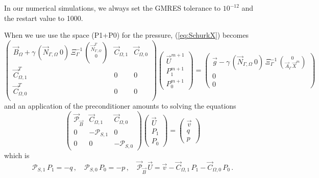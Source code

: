 \documentclass[a4paper,12pt,onecolumn]{article}
\newcommand{\NbulkT}{\vec{N}_{\Gamma,\Omega}^T}
\newcommand{\Nbulk}{\vec{N}_{\Gamma,\Omega}}
\begin{document}
In our numerical simulations, we always set the GMRES tolerance to $10^{-12}$
and the restart value to 1000.

When we use use the space (P1+P0) for the pressure, (\ref{eq:SchurkX}) becomes
\begin{subequations}
\begin{equation} \label{eq:SchurkXP1P0}
\begin{pmatrix}
\vec B_\Omega + \gamma\,(\Nbulk \ 0)\,\Xi_\Gamma^{-1}\,\binom{\NbulkT}{0} &
\vec C_{\Omega,1} & \vec C_{\Omega,0} \\
\vec C^T_{\Omega,1} & 0 & 0 \\
\vec C^T_{\Omega,0} & 0 & 0 \\
\end{pmatrix}
\begin{pmatrix}
\vec U^{m+1} \\
P^{m+1}_1 \\
P^{m+1}_0
\end{pmatrix}
= \begin{pmatrix}
\vec g-\gamma\,(\Nbulk \ 0)\,
\Xi_\Gamma^{-1}\,\binom{0}{\vec{A}_\Gamma\,\vec{X}^{m}} \\
0 \\
0
\end{pmatrix}
\end{equation}
\end{subequations}
and an application of the preconditioner amounts to solving the equations
\begin{equation*}
\begin{pmatrix}
\vec{\mathcal{P}}_{\vec B} & \vec C_{\Omega,1} & \vec C_{\Omega,0} \\
0 & -\mathcal{P}_{S,1} & 0 \\
0 & 0 &-\mathcal{P}_{S,0}
\end{pmatrix}
\begin{pmatrix}
\vec U \\
P_1 \\
P_0
\end{pmatrix}
=
\begin{pmatrix}
\vec v \\
q \\
p
\end{pmatrix}
\end{equation*}
which is
\begin{equation*}
\mathcal{P}_{S,1}\,P_1 = -q\,,\quad \mathcal{P}_{S,0}\,P_0 = -p\,,\quad \vec{\mathcal{P}}_{\vec B}\,\vec U = \vec v - \vec C_{\Omega,1}\,P_1 - \vec C_{\Omega,0}\,P_0\,.
\end{equation*}
\end{document}
